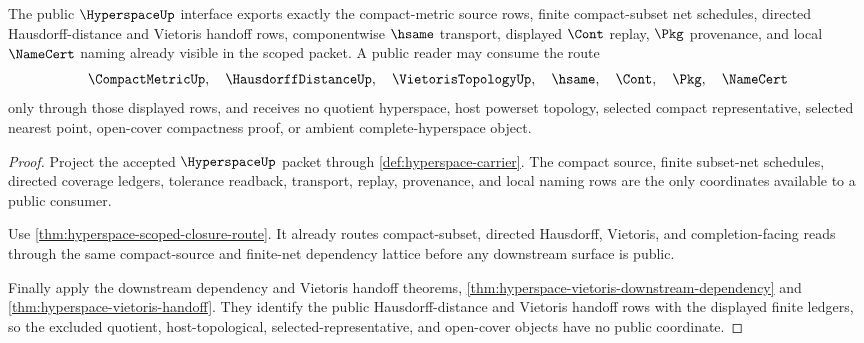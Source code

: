 \begin{theorem}
\label{thm:hyperspace-public-certificate}
The public $\HyperspaceUp$ interface exports exactly the compact-metric source rows, finite compact-subset net schedules, directed Hausdorff-distance and Vietoris handoff rows, componentwise $\hsame$ transport, displayed $\Cont$ replay, $\Pkg$ provenance, and local $\NameCert$ naming already visible in the scoped packet. A public reader may consume the route
$$
\CompactMetricUp,\quad
\HausdorffDistanceUp,\quad
\VietorisTopologyUp,\quad
\hsame,\quad
\Cont,\quad
\Pkg,\quad
\NameCert
$$
only through those displayed rows, and receives no quotient hyperspace, host powerset topology, selected compact representative, selected nearest point, open-cover compactness proof, or ambient complete-hyperspace object.
\end{theorem}
\begin{proof}
Project the accepted $\HyperspaceUp$ packet through \autoref{def:hyperspace-carrier}. The compact source, finite subset-net schedules, directed coverage ledgers, tolerance readback, transport, replay, provenance, and local naming rows are the only coordinates available to a public consumer.

Use \autoref{thm:hyperspace-scoped-closure-route}. It already routes compact-subset, directed Hausdorff, Vietoris, and completion-facing reads through the same compact-source and finite-net dependency lattice before any downstream surface is public.

Finally apply the downstream dependency and Vietoris handoff theorems, \autoref{thm:hyperspace-vietoris-downstream-dependency} and \autoref{thm:hyperspace-vietoris-handoff}. They identify the public Hausdorff-distance and Vietoris handoff rows with the displayed finite ledgers, so the excluded quotient, host-topological, selected-representative, and open-cover objects have no public coordinate.
\end{proof}
